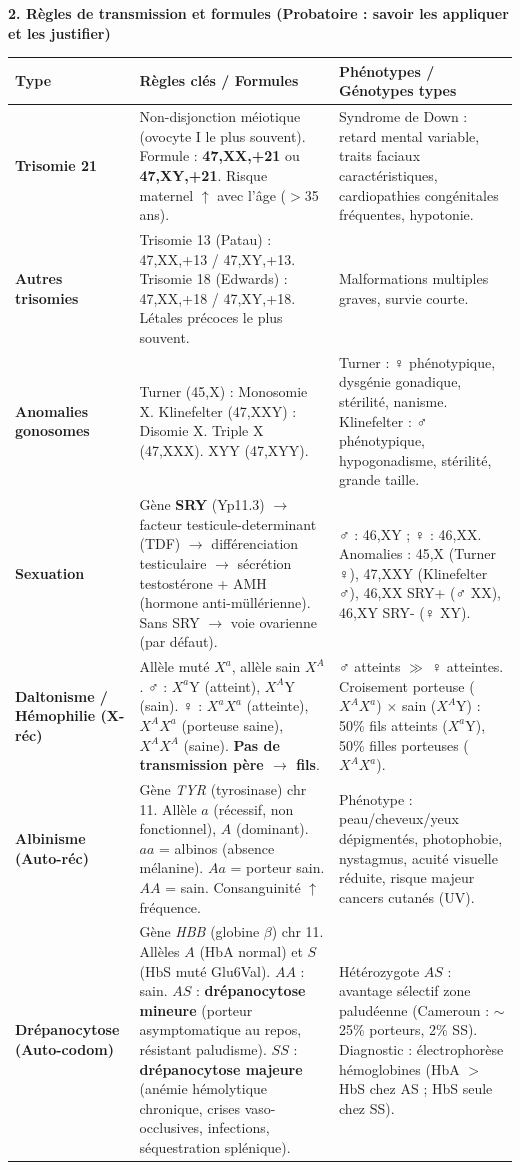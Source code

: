 \documentclass[11pt]{article}
\begin{document}
\begin{bilan}
\textbf{2. Règles de transmission et formules (Probatoire : savoir les appliquer et les justifier)}
\begin{center}
\begin{tabularx}{\linewidth}{|l|X|X|}\hline
\rowcolor{popblueL}
\textbf{Type} & \textbf{Règles clés / Formules} & \textbf{Phénotypes / Génotypes types} \\ \hline
\textbf{Trisomie 21} & Non-disjonction méiotique (ovocyte I le plus souvent). Formule : \textbf{47,XX,+21} ou \textbf{47,XY,+21}. Risque maternel $\uparrow$ avec l'âge ($>$35 ans). & Syndrome de Down : retard mental variable, traits faciaux caractéristiques, cardiopathies congénitales fréquentes, hypotonie. \\ \hline
\textbf{Autres trisomies} & Trisomie 13 (Patau) : 47,XX,+13 / 47,XY,+13. Trisomie 18 (Edwards) : 47,XX,+18 / 47,XY,+18. Létales précoces le plus souvent. & Malformations multiples graves, survie courte. \\ \hline
\textbf{Anomalies gonosomes} & Turner (45,X) : Monosomie X. Klinefelter (47,XXY) : Disomie X. Triple X (47,XXX). XYY (47,XYY). & Turner : ♀ phénotypique, dysgénie gonadique, stérilité, nanisme. Klinefelter : ♂ phénotypique, hypogonadisme, stérilité, grande taille. \\ \hline
\textbf{Sexuation} & Gène \textbf{SRY} (Yp11.3) $\rightarrow$ facteur testicule-determinant (TDF) $\rightarrow$ différenciation testiculaire $\rightarrow$ sécrétion testostérone + AMH (hormone anti-müllérienne). Sans SRY $\rightarrow$ voie ovarienne (par défaut). & ♂ : 46,XY ; ♀ : 46,XX. Anomalies : 45,X (Turner ♀), 47,XXY (Klinefelter ♂), 46,XX SRY+ (♂ XX), 46,XY SRY- (♀ XY). \\ \hline
\textbf{Daltonisme / Hémophilie (X-réc)} & Allèle muté $X^a$, allèle sain $X^A$. ♂ : $X^a$Y (atteint), $X^A$Y (sain). ♀ : $X^aX^a$ (atteinte), $X^AX^a$ (porteuse saine), $X^AX^A$ (saine). \textbf{Pas de transmission père $\to$ fils}. & ♂ atteints $\gg$ ♀ atteintes. Croisement porteuse ($X^AX^a$) $\times$ sain ($X^A$Y) : 50\% fils atteints ($X^a$Y), 50\% filles porteuses ($X^AX^a$). \\ \hline
\textbf{Albinisme (Auto-réc)} & Gène \emph{TYR} (tyrosinase) chr 11. Allèle $a$ (récessif, non fonctionnel), $A$ (dominant). $aa$ = albinos (absence mélanine). $Aa$ = porteur sain. $AA$ = sain. Consanguinité $\uparrow$ fréquence. & Phénotype : peau/cheveux/yeux dépigmentés, photophobie, nystagmus, acuité visuelle réduite, risque majeur cancers cutanés (UV). \\ \hline
\textbf{Drépanocytose (Auto-codom)} & Gène \emph{HBB} (globine $\beta$) chr 11. Allèles $A$ (HbA normal) et $S$ (HbS muté Glu6Val). $AA$ : sain. $AS$ : \textbf{drépanocytose mineure} (porteur asymptomatique au repos, résistant paludisme). $SS$ : \textbf{drépanocytose majeure} (anémie hémolytique chronique, crises vaso-occlusives, infections, séquestration splénique). & Hétérozygote $AS$ : avantage sélectif zone paludéenne (Cameroun : $\sim$25\% porteurs, 2\% SS). Diagnostic : électrophorèse hémoglobines (HbA $>$ HbS chez AS ; HbS seule chez SS). \\ \hline
\end{tabularx}
\end{center}


\end{bilan}
\end{document}
